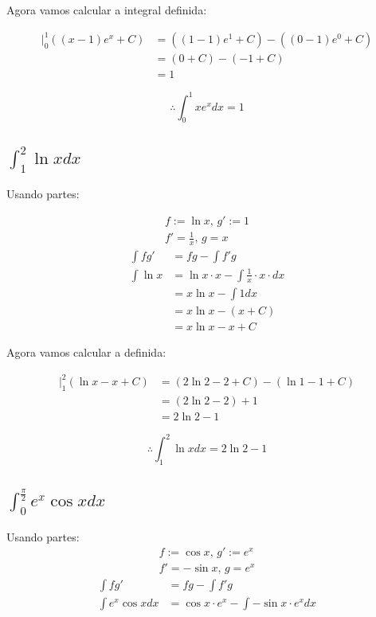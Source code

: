 \documentclass[12pt]{article}
\theoremstyle{definition}
\begin{document}
Agora vamos calcular a integral definida:

\begin{align*}
	\bigg\rvert_0^1 ((x-1) e^x + C)
	  & = ((1-1) e^1 + C) - ((0-1) e^0 + C) \\
	  & = (0 + C) - (- 1 + C)               \\
	  & = 1                                 
\end{align*}

\[
	\boxed{
		\therefore \int_0^1 x e^x dx = 1
	}
\]
\subsection{\(\int_1^2 \ln{x} dx\)}
Usando partes:

\begin{align*}
	f := \ln{x}\text{, } g' := 1    \\
	f' = \frac{1}{x}\text{, } g = x 
\end{align*}
\begin{align*}
	\int f g'
	  & = fg - \int f' g                                    \\
	\int \ln{x}
	  & = \ln{x}\cdot x - \int \frac{1}{x} \cdot x \cdot dx \\
	  & = x \ln{x} - \int 1 dx                              \\
	  & = x \ln{x} - (x + C)                                \\
	  & = x \ln{x} - x + C                                  
\end{align*}

Agora vamos calcular a definida:

\begin{align*}
	\bigg\rvert_1^2 (\ln{x} - x + C)
	  & = (2\ln{2} - 2 + C) - (\ln{1} - 1 + C) \\
	  & = (2\ln{2} - 2) + 1                    \\
	  & = 2\ln{2} - 1                          
\end{align*}

\[
	\boxed{
		\therefore \int_1^2 \ln{x} dx = 2\ln{2} - 1
	}
\]
\subsection{\(\int_0^{\frac{\pi}{2}} e^x \cos{x} dx\)}
Usando partes:
\begin{align*}
	f := \cos{x}\text{, } g' := e^x \\
	f' = -\sin{x}\text{, } g = e^x  
\end{align*}
\begin{align*}
	\int f g'
	  & = fg - \int f' g                                 \\
	\int{e^x \cos{x} dx}
	  & = \cos{x}\cdot e^x - \int{-\sin{x} \cdot e^x dx} 
\end{align*}
\end{document}
